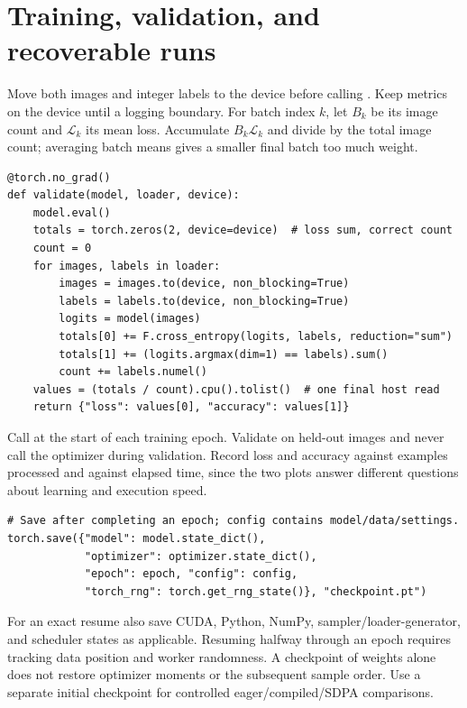 \documentclass[11pt,a4paper,oneside]{report}
\newcommand{\code}[1]{\texttt{\detokenize{#1}}}
\begin{document}
\newpage
\section{Training, validation, and recoverable runs}
Move both images and integer labels to the device before calling
\code{train_step}. Keep metrics on the device until a logging boundary.
For batch index $k$, let $B_k$ be its image count and $\mathcal L_k$ its mean
loss. Accumulate $B_k\mathcal L_k$ and divide by the total image count;
averaging batch means gives a smaller final batch too much weight.

\begin{lstlisting}[style=python]
@torch.no_grad()
def validate(model, loader, device):
    model.eval()
    totals = torch.zeros(2, device=device)  # loss sum, correct count
    count = 0
    for images, labels in loader:
        images = images.to(device, non_blocking=True)
        labels = labels.to(device, non_blocking=True)
        logits = model(images)
        totals[0] += F.cross_entropy(logits, labels, reduction="sum")
        totals[1] += (logits.argmax(dim=1) == labels).sum()
        count += labels.numel()
    values = (totals / count).cpu().tolist()  # one final host read
    return {"loss": values[0], "accuracy": values[1]}
\end{lstlisting}

Call \code{model.train()} at the start of each training epoch. Validate on
held-out images and never call the optimizer during validation. Record loss
and accuracy against examples processed and against elapsed time, since the
two plots answer different questions about learning and execution speed.

\begin{lstlisting}[style=python]
# Save after completing an epoch; config contains model/data/settings.
torch.save({"model": model.state_dict(),
            "optimizer": optimizer.state_dict(),
            "epoch": epoch, "config": config,
            "torch_rng": torch.get_rng_state()}, "checkpoint.pt")
\end{lstlisting}

For an exact resume also save CUDA, Python, NumPy, sampler/loader-generator,
and scheduler states as applicable. Resuming halfway through an epoch requires
tracking data position and worker randomness. A checkpoint of weights alone
does not restore optimizer moments or the subsequent sample order. Use a
separate initial checkpoint for controlled eager/compiled/SDPA comparisons.
\end{document}
